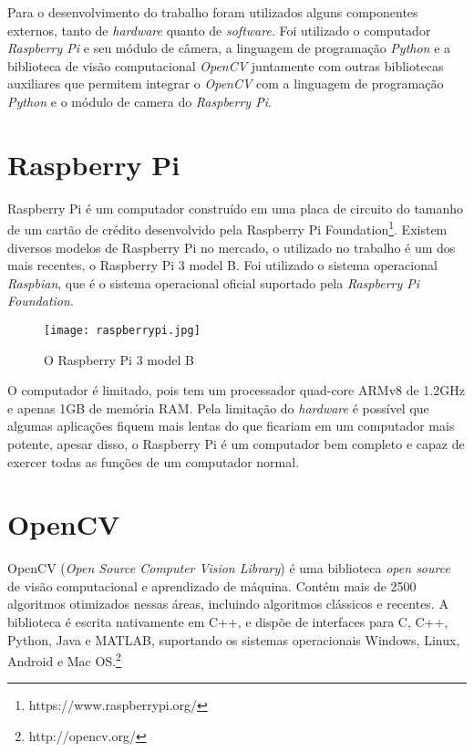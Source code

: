 Para o desenvolvimento do trabalho foram utilizados alguns componentes externos, tanto de \emph{hardware} quanto de \emph{software}. Foi utilizado o computador \emph{Raspberry Pi} e seu módulo de câmera, a linguagem de programação \emph{Python} e a biblioteca de visão computacional \emph{OpenCV} juntamente com outras bibliotecas auxiliares que permitem integrar o \emph{OpenCV} com a linguagem de programação \emph{Python} e o módulo de camera do \emph{Raspberry Pi}.

\section{Raspberry Pi}
\label{sec:raspi}

Raspberry Pi é um computador construído em uma placa de circuito do tamanho de um cartão de crédito desenvolvido pela Raspberry Pi Foundation\footnote{https://www.raspberrypi.org/}. Existem diversos modelos de Raspberry Pi no mercado, o utilizado no trabalho é um dos mais recentes, o Raspberry Pi 3 model B. Foi utilizado o sistema
operacional \emph{Raspbian}, que é o sistema operacional oficial suportado pela \emph{Raspberry Pi Foundation}.

\begin{figure}[H]
	\centering
	\texttt{[image: raspberrypi.jpg]}
	\caption{O Raspberry Pi 3 model B}
	\label{fig:raspberrypi}
\end{figure}

O computador é limitado, pois tem um processador
quad-core ARMv8 de 1.2GHz e apenas 1GB de memória RAM\@. Pela limitação do
\emph{hardware} é possível que algumas aplicações fiquem mais lentas do que
ficariam em um computador mais potente, apesar disso, o Raspberry Pi é um
computador bem completo e capaz de exercer todas as funções de um computador
normal.

\section{OpenCV}
\label{sec:opencv}

OpenCV (\emph{Open Source Computer Vision Library}) é uma biblioteca \emph{open
source} de visão computacional e aprendizado de máquina. Contém mais de 2500
algoritmos otimizados nessas áreas, incluindo algoritmos clássicos e recentes. A biblioteca é escrita nativamente em C++, e dispõe de interfaces para C, C++,
Python, Java e MATLAB, suportando os sistemas operacionais Windows, Linux,
Android e Mac OS.\footnote{http://opencv.org/}

